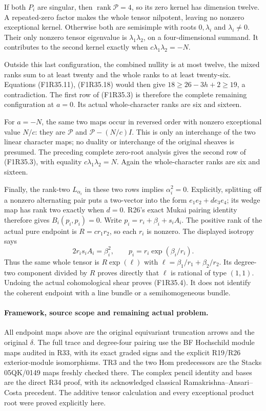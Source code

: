 If both $P_i$ are singular, then
$\operatorname{rank}\mathcal P=4$, so its zero
kernel has dimension twelve. A repeated-zero factor
makes the whole tensor nilpotent, leaving no nonzero
exceptional kernel. Otherwise both are semisimple
with roots $0,\lambda_i$ and $\lambda_i\ne0$.
Their only nonzero tensor eigenvalue is
$\lambda_1\lambda_2$, on a four-dimensional summand.
It contributes to the second kernel exactly when
$c\lambda_1\lambda_2=-N$.

Outside this last configuration, the combined nullity
is at most twelve, the mixed ranks sum to at least
twenty and the whole ranks to at least twenty-six.
Equations (F1R35.11), (F1R35.18) would then give
$18\ge26-3h+2\ge19$, a contradiction. The first
row of (F1R35.3) is therefore the complete remaining
configuration at $a=0$. Its actual whole-character
ranks are six and sixteen.

For $a=-N$, the same two maps occur in reversed
order with nonzero exceptional value $N/c$:
they are $\mathcal P$ and $\mathcal P-(N/c)I$.
This is only an interchange of the two linear
character maps; no duality or interchange of the
original sheaves is presumed. The preceding complete
zero-root analysis gives the second row of
(F1R35.3), with equality $c\lambda_1\lambda_2=N$.
Again the whole-character ranks are six and sixteen.

Finally, the rank-two $L_{\alpha_i}$ in these two rows
implies $\alpha_i^2=0$. Explicitly, splitting off a
nonzero alternating pair puts a two-vector into the
form $e_1e_2+d e_3e_4$; its wedge map has rank two
exactly when $d=0$. R26's exact Mukai pairing identity
therefore gives $B_i(p_i,p_i)=0$. Write
$p_i=r_i+\beta_i+s_iA_i$. The positive rank of the
actual pure endpoint is $R=c r_1r_2$, so each $r_i$
is nonzero. The displayed isotropy says
\[
                 2r_i s_i A_i=\beta_i^2,
                  \qquad p_i=r_i\exp(\beta_i/r_i).
 \tag{F1R35.20}
\]
Thus the same whole tensor is $R\exp(\ell)$ with
$\ell=\beta_1/r_1+\beta_2/r_2$. Its degree-two
component divided by $R$ proves directly that
$\ell$ is rational of type $(1,1)$. Undoing the
actual cohomological shear proves (F1R35.4).
It does not identify the coherent endpoint with
a line bundle or a semihomogeneous bundle.

\paragraph{Framework, source scope and remaining actual problem.}
All endpoint maps above are the original equivariant
truncation arrows and the original $\delta$.
The full trace and degree-four pairing use the BF
Hochschild module maps audited in R33, with its exact
graded signs and the explicit R19/R26 exterior-module
isomorphisms. TR3 and the two Hom predecessors are the
Stacks 05QK/0149 maps freshly checked there.
The complex pencil identity and bases are the direct
R34 proof, with its acknowledged classical
Ramakrishna--Ansari--Costa precedent. The additive
tensor calculation and every exceptional product root
were proved explicitly here.

